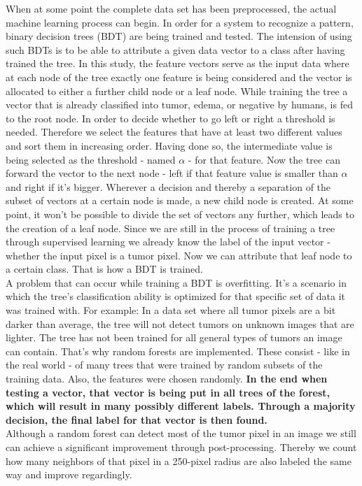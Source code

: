\documentclass{article}
\begin{document}
 When at some point the complete data set has been preprocessed, the actual machine learning process can begin. In order for a system to recognize a pattern, binary decision trees (BDT) are being trained and tested. The intension of using such BDTs is to be able to attribute a given data vector to a class after having trained the tree. In this study, the feature vectors serve as the input data where at each node of the tree exactly one feature is being considered and the vector is allocated to either a further child node or a leaf node. While training the tree a vector that is already classified into tumor, edema, or negative by humans, is fed to the root node. In order to decide whether to go left or right a threshold is needed. Therefore we select the features that have at least two different values and sort them in increasing order. Having done so, the intermediate value is being selected as the threshold - named $\alpha $ - for that feature. Now the tree can forward the vector to the next node - left if that feature value is smaller than $\alpha $ and right if it's bigger. Wherever a decision and thereby a separation of the subset of vectors at a certain node is made, a new child node is created. At some point, it won't be possible to divide the set of vectors any further, which leads to the creation of a leaf node. Since we are still in the process of training a tree through supervised learning we already know the label of the input vector - whether the input pixel is a tumor pixel. Now we can attribute that leaf node to a certain class. That is how a BDT is trained. \\


 A problem that can occur while training a BDT is overfitting. It's a scenario in which the tree's classification ability is optimized for that specific set of data it was trained with. For example: In a data set where all tumor pixels are a bit darker than average, the tree will not detect tumors on unknown images that are lighter. The tree has not been trained for all general types of tumors an image can contain. That's why random forests are implemented. These consist - like in the real world - of many trees that were trained by random subsets of the training data. Also, the features were chosen randomly. \textbf{In the end when testing a vector, that vector is being put in all trees of the forest, which will result in many possibly different labels. Through a majority decision, the final label for that vector is then found.}\\


 Although a random forest can detect most of the tumor pixel in an image we still can achieve a significant improvement through post-processing. Thereby we count how many neighbors of that pixel in a 250-pixel radius are also labeled the same way and improve regardingly. 
\end{document}
